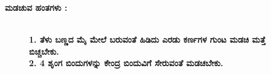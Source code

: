 \noindent
\textbf{ಮಡಚುವ ಹಂತಗಳು :}
\begin{figure}[H]
\\
\textbf{1. ತೆಳು ಬಣ್ಣದ ಮೈ ಮೇಲೆ ಬರುವಂತೆ ಹಿಡಿದು ಎರಡು ಕರ್ಣಗಳ ಗುಂಟ ಮಡಚಿ ಮತ್ತೆ ಬಿಚ್ಚಬೇಕು.}\\
\textbf{2. 4 ಶೃಂಗ ಬಿಂದುಗಳನ್ನು ಕೇಂದ್ರ ಬಿಂದುವಿಗೆ ಸೇರುವಂತೆ ಮಡಚಬೇಕು.}
\end{figure}

\newpage

